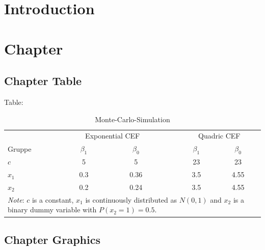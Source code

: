 \documentclass[12pt,a4paper]{article}
\begin{document}
\tableofcontents
\newpage


\section{Introduction}

\blindtext

\newpage




\section{Chapter}

\blindtext

\subsection{Chapter Table}

Table:
\begin{table}[ht]
\centering
\caption{Monte-Carlo-Simulation}
\label{mc-param}
\begin{tabular}{lccccc}\toprule
 &  \multicolumn{2}{c}{Exponential CEF} & & \multicolumn{2}{c}{Quadric CEF} \\
Gruppe  & $\beta_1$ & $\beta_0$ &  & $\beta_1$ & $\beta_0$ \\ \cmidrule{2-3} \cmidrule{5-6}
$c$      & 5    & 5     & & 23  & 23 \\
$x_1$   & 0.3   & 0.36  & & 3.5 & 4.55 \\
$x_2$   & 0.2   & 0.24  & & 3.5 & 4.55 \\ \bottomrule
\multicolumn{6}{p{9cm}}{\footnotesize\textit{Note}: $c$ is a constant,  $x_1$ is continuously distributed as
$N(0,1)$ and $x_2$ is a binary dummy variable with $P(x_2=1)=0.5$. }
\end{tabular}
\end{table}

\newpage
\subsection{Chapter Graphics}
\end{document}
